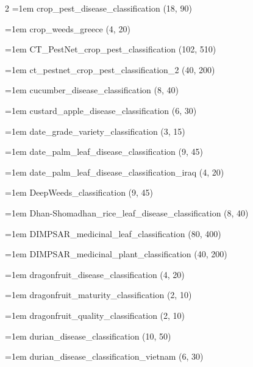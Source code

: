 \begin{multicols}{2}
\hangindent=1em crop\_\allowbreak{}pest\_\allowbreak{}disease\_\allowbreak{}classification (18, 90)\par
\hangindent=1em crop\_\allowbreak{}weeds\_\allowbreak{}greece (4, 20)\par
\hangindent=1em CT\_\allowbreak{}PestNet\_\allowbreak{}crop\_\allowbreak{}pest\_\allowbreak{}classification (102, 510)\par
\hangindent=1em ct\_\allowbreak{}pestnet\_\allowbreak{}crop\_\allowbreak{}pest\_\allowbreak{}classification\_\allowbreak{}2 (40, 200)\par
\hangindent=1em cucumber\_\allowbreak{}disease\_\allowbreak{}classification (8, 40)\par
\hangindent=1em custard\_\allowbreak{}apple\_\allowbreak{}disease\_\allowbreak{}classification (6, 30)\par
\hangindent=1em date\_\allowbreak{}grade\_\allowbreak{}variety\_\allowbreak{}classification (3, 15)\par
\hangindent=1em date\_\allowbreak{}palm\_\allowbreak{}leaf\_\allowbreak{}disease\_\allowbreak{}classification (9, 45)\par
\hangindent=1em date\_\allowbreak{}palm\_\allowbreak{}leaf\_\allowbreak{}disease\_\allowbreak{}classification\_\allowbreak{}iraq (4, 20)\par
\hangindent=1em DeepWeeds\_\allowbreak{}classification (9, 45)\par
\hangindent=1em Dhan-Shomadhan\_\allowbreak{}rice\_\allowbreak{}leaf\_\allowbreak{}disease\_\allowbreak{}classification (8, 40)\par
\hangindent=1em DIMPSAR\_\allowbreak{}medicinal\_\allowbreak{}leaf\_\allowbreak{}classification (80, 400)\par
\hangindent=1em DIMPSAR\_\allowbreak{}medicinal\_\allowbreak{}plant\_\allowbreak{}classification (40, 200)\par
\hangindent=1em dragonfruit\_\allowbreak{}disease\_\allowbreak{}classification (4, 20)\par
\hangindent=1em dragonfruit\_\allowbreak{}maturity\_\allowbreak{}classification (2, 10)\par
\hangindent=1em dragonfruit\_\allowbreak{}quality\_\allowbreak{}classification (2, 10)\par
\hangindent=1em durian\_\allowbreak{}disease\_\allowbreak{}classification (10, 50)\par
\hangindent=1em durian\_\allowbreak{}disease\_\allowbreak{}classification\_\allowbreak{}vietnam (6, 30)\par

\end{multicols}
